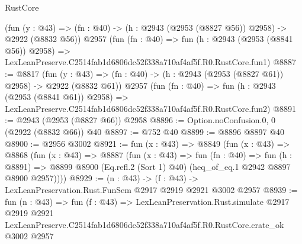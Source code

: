 \begin{lexlean}{RustCore}
\begin{coremodule}
    (fun (y : @43) => (fn : @40) -> (h : @2943 (@2953 (@8827 @56)) @2958) -> @2922 (@8832 @56))
    @2957
    (fun (fn : @40) =>
    fun (h : @2943 (@2953 (@8841 @56)) @2958) =>
    LexLeanPreserve.C2514fab1d6806dc52f338a710af4af5f.R0.RustCore.fun1)
@8887 := @8817
    (fun (y : @43) => (fn : @40) -> (h : @2943 (@2953 (@8827 @61)) @2958) -> @2922 (@8832 @61))
    @2957
    (fun (fn : @40) =>
    fun (h : @2943 (@2953 (@8841 @61)) @2958) =>
    LexLeanPreserve.C2514fab1d6806dc52f338a710af4af5f.R0.RustCore.fun2)
@8891 := @2943 (@2953 (@8827 @66)) @2958
@8896 := Option.noConfusion.{0, 0} (@2922 (@8832 @66)) @40
@8897 := @752 @40
@8899 := @8896 @8897 @40
@8900 := @2956 @3002
@8921 := fun (x : @43) =>
  @8849
    (fun (x : @43) =>
    @8868
      (fun (x : @43) =>
      @8887
        (fun (x : @43) =>
        fun (fn : @40) =>
        fun (h : @8891) =>
        @8899 @8900 (Eq.refl.{2} (Sort 1) @40) (heq_of_eq.{1} @2942 @8897 @8900 @2957))))
@8929 := (n : @43) -> (f : @43) -> LexLeanPreservation.Rust.FunSem @2917 @2919 @2921 @3002 @2957
@8939 := fun (n : @43) =>
  fun (f : @43) =>
  LexLeanPreservation.Rust.simulate
    @2917
    @2919
    @2921
    LexLeanPreserve.C2514fab1d6806dc52f338a710af4af5f.R0.RustCore.crate_ok
    @3002
    @2957
\end{coremodule}
\end{lexlean}

